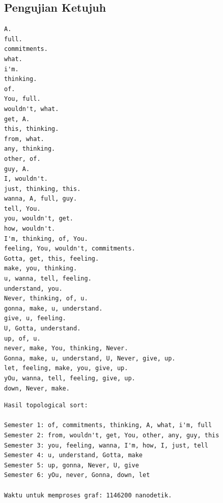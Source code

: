 \documentclass{article}
\begin{document}
\subsection{Pengujian Ketujuh}
\begin{lstlisting}[caption = \textit{input}]
A.
full.
commitments.
what.
i'm.
thinking.
of.
You, full.
wouldn't, what.
get, A.
this, thinking.
from, what.
any, thinking.
other, of.
guy, A.
I, wouldn't.
just, thinking, this.
wanna, A, full, guy.
tell, You.
you, wouldn't, get.
how, wouldn't.
I'm, thinking, of, You.
feeling, You, wouldn't, commitments.
Gotta, get, this, feeling.
make, you, thinking.
u, wanna, tell, feeling.
understand, you.
Never, thinking, of, u.
gonna, make, u, understand.
give, u, feeling.
U, Gotta, understand.
up, of, u.
never, make, You, thinking, Never.
Gonna, make, u, understand, U, Never, give, up.
let, feeling, make, you, give, up.
yOu, wanna, tell, feeling, give, up.
down, Never, make.
\end{lstlisting}
\begin{lstlisting}[caption = \textit{output}]
Hasil topological sort:

Semester 1: of, commitments, thinking, A, what, i'm, full
Semester 2: from, wouldn't, get, You, other, any, guy, this
Semester 3: you, feeling, wanna, I'm, how, I, just, tell
Semester 4: u, understand, Gotta, make
Semester 5: up, gonna, Never, U, give
Semester 6: yOu, never, Gonna, down, let

Waktu untuk memproses graf: 1146200 nanodetik.
\end{lstlisting}
\end{document}
